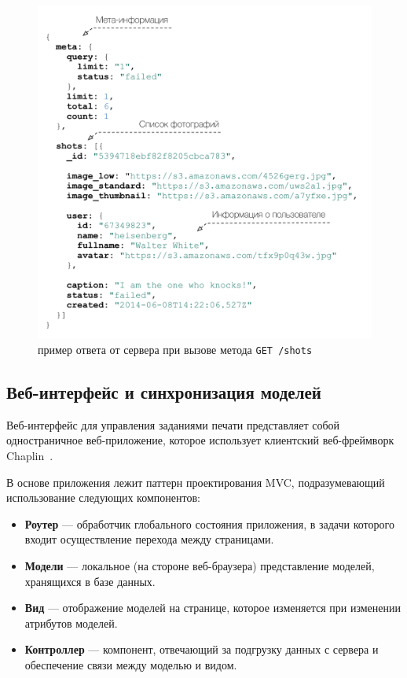 \documentclass[a4paper,14pt,href,draft]{article}
\begin{document}
\begin{figure}[t!]
\begin{center}
  \includegraphics[scale=0.7]{json-response.pdf}
    \caption{пример ответа от сервера при вызове метода \texttt{GET /shots}}
    \label{fig:JsonResponse}
\end{center}
\end{figure}


\subsection{Веб-интерфейс и синхронизация моделей}
Веб-интерфейс для управления заданиями печати представляет собой одностраничное веб-приложение, которое использует
клиентский веб-фреймворк Chaplin~\cite{ChaplinJS}.

В основе приложения лежит паттерн проектирования MVC, подразумевающий использование следующих компонентов:
\begin{itemize}
  \item \textbf{Роутер} --- обработчик глобального состояния приложения, в задачи которого входит осуществление перехода между
    страницами.
  \item \textbf{Модели} --- локальное (на стороне веб-браузера) представление моделей, хранящихся в базе данных.
  \item \textbf{Вид} --- отображение моделей на странице, которое изменяется при изменении атрибутов моделей.
  \item \textbf{Контроллер} --- компонент, отвечающий за подгрузку данных с сервера и обеспечение связи между моделью и видом.
\end{itemize}
\end{document}
